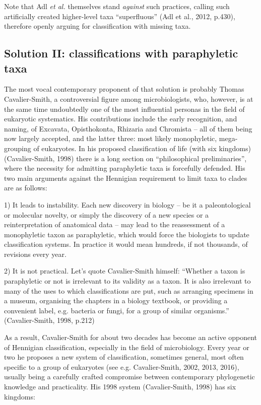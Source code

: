 \begin{artengenv}
Note that Adl \textit{et al. }themselves stand \textit{against }such practices, calling such artificially created
higher-level taxa “superfluous”  \label{ref:RNDTkKC0gomXM}(Adl et al., 2012, p.430), therefore openly arguing for
classification with missing taxa.

\subsection{Solution II: classifications with paraphyletic taxa}

The most vocal contemporary proponent of that solution is probably Thomas Cavalier-Smith, a controversial figure among
microbiologists, who, however, is at the same time undoubtedly one of the most influential personas in the field of
eukaryotic systematics. His contributions include the early recognition, and naming, of Excavata, Opisthokonta,
Rhizaria and Chromista – all of them being now largely accepted, and the latter three: most likely monophyletic,
mega-grouping of eukaryotes. In his proposed classification of life (with six kingdoms)
\label{ref:RNDScaXMIFqT5}(Cavalier-Smith, 1998) there is a long section on “philosophical preliminaries”, where the
necessity for admitting paraphyletic taxa is forcefully defended. His two main arguments against the Hennigian
requirement to limit taxa to clades are as follows:

1) It leads to instability. Each new discovery in biology – be it a paleontological or molecular novelty, or simply the
discovery of a new species or a reinterpretation of anatomical data – may lead to the reassessment of a monophyletic
taxon as paraphyletic, which would force the biologists to update classification systems. In practice it would mean
hundreds, if not thousands, of revisions every year.

2) It is not practical. Let’s quote Cavalier-Smith himself: “Whether a taxon is paraphyletic or not is irrelevant to its
validity as a taxon. It is also irrelevant to many of the uses to which classifications are put, such as arranging
specimens in a museum, organising the chapters in a biology textbook, or providing a convenient label, e.g. bacteria or
fungi, for a group of similar organisms.” \label{ref:RNDUlTuwI9YEO}(Cavalier-Smith, 1998, p.212)

As a result, Cavalier-Smith for about two decades has become an active opponent of Hennigian classification, especially
in the field of microbiology. Every year or two he proposes a new system of classification, sometimes general, most
often specific to a group of eukaryotes \label{ref:RNDtoAIslWhri}(see e.g. Cavalier-Smith, 2002, 2013, 2016), usually
being a carefully crafted compromise between contemporary phylogenetic knowledge and practicality. His 1998 system
\label{ref:RNDJbJ6dU4tG1}(Cavalier-Smith, 1998) has six kingdoms:


\end{artengenv}
